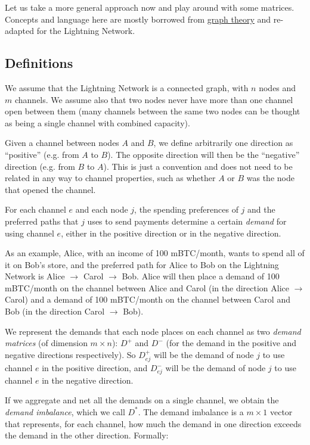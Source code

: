 \documentclass[a4paper]{article}
\begin{document}
Let us take a more general approach now and play around with some matrices. Concepts and language here are mostly borrowed from \href{https://en.wikipedia.org/wiki/Graph_theory}{graph theory} and re-adapted for the Lightning Network.

\subsection{Definitions}

We assume that the Lightning Network is a connected graph, with $n$ nodes and $m$ channels. We assume also that two nodes never have more than one channel open between them (many channels between the same two nodes can be thought as being a single channel with combined capacity).

Given a channel between nodes $A$ and $B$, we define arbitrarily one direction as ``positive'' (e.g. from $A$ to $B$). The opposite direction will then be the ``negative'' direction (e.g. from $B$ to $A$). This is just a convention and does not need to be related in any way to channel properties, such as whether $A$ or $B$ was the node that opened the channel.

For each channel $e$ and each node $j$, the spending preferences of $j$ and the preferred paths that $j$ uses to send payments determine a certain \emph{demand} for using channel $e$, either in the positive direction or in the negative direction.

As an example, Alice, with an income of 100 mBTC/month, wants to spend all of it on Bob's store, and the preferred path for Alice to Bob on the Lightning Network is Alice $\rightarrow$ Carol $\rightarrow$ Bob. Alice will then place a demand of 100 mBTC/month on the channel between Alice and Carol (in the direction Alice $\rightarrow$ Carol) and a demand of 100 mBTC/month on the channel between Carol and Bob (in the direction Carol $\rightarrow$ Bob).

We represent the demands that each node places on each channel as two \emph{demand matrices} (of dimension $m \times n$): $D^+$ and $D^-$ (for the demand in the positive and negative directions respectively). So $D^+_{ej}$ will be the demand of node $j$ to use channel $e$ in the positive direction, and $D^-_{ej}$ will be the demand of node $j$ to use channel $e$ in the negative direction.

If we aggregate and net all the demands on a single channel, we obtain the \emph{demand imbalance}, which we call $D^*$. The demand imbalance is a $m \times 1$ vector that represents, for each channel, how much the demand in one direction exceeds the demand in the other direction. Formally:
\end{document}
